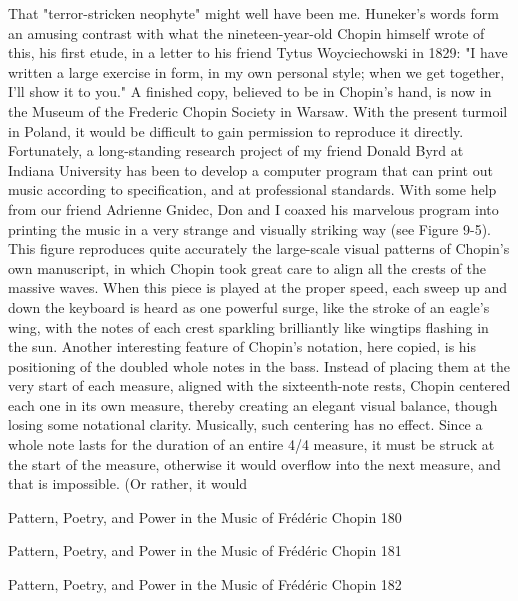          That "terror-stricken neophyte" might well have been me. Huneker's words form
an amusing contrast with what the nineteen-year-old Chopin himself wrote of this, his
first etude, in a letter to his friend Tytus Woyciechowski in 1829: "I have written a large
exercise in form, in my own personal style; when we get together, I'll show it to you." A
finished copy, believed to be in Chopin's hand, is now in the Museum of the Frederic
Chopin Society in Warsaw. With the present turmoil in Poland, it would be difficult to
gain permission to reproduce it directly. Fortunately, a long-standing research project of
my friend Donald Byrd at Indiana University has been to develop a computer program
that can print out music according to specification, and at professional standards. With
some help from our friend Adrienne Gnidec, Don and I coaxed his marvelous program
into printing the music in a very strange and visually striking way (see Figure 9-5). This
figure reproduces quite accurately the large-scale visual patterns of Chopin's own
manuscript, in which Chopin took great care to align all the crests of the massive waves.
When this piece is played at the proper speed, each sweep up and down the keyboard is
heard as one powerful surge, like the stroke of an eagle's wing, with the notes of each
crest sparkling brilliantly like wingtips flashing in the sun.
Another interesting feature of Chopin's notation, here copied, is his positioning of the
doubled whole notes in the bass. Instead of placing them at the very start of each
measure, aligned with the sixteenth-note rests, Chopin centered each one in its own
measure, thereby creating an elegant visual balance, though losing some notational
clarity. Musically, such centering has no effect. Since a whole note lasts for the duration
of an entire 4/4 measure, it must be struck at the start of the measure, otherwise it would
overflow into the next measure, and that is impossible. (Or rather, it would




Pattern, Poetry, and Power in the Music of Frédéric Chopin                             180

Pattern, Poetry, and Power in the Music of Frédéric Chopin   181

Pattern, Poetry, and Power in the Music of Frédéric Chopin   182

